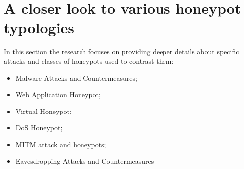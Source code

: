 \chapter{A closer look to various honeypot typologies}
In this section the research focuses on providing deeper details about specific attacks and classes of honeypots used to contrast them:
\begin{itemize}
    \item Malware Attacks and Countermeasures;
    \item Web Application Honeypot;
    \item Virtual Honeypot;
    \item DoS Honeypot;
    \item MITM attack and honeypots;
    \item Eavesdropping Attacks and Countermeasures
\end{itemize}







